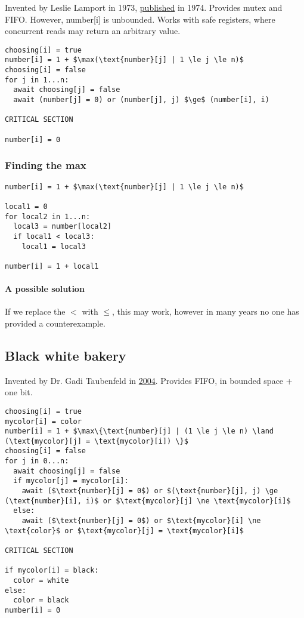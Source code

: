 \documentclass{idc_msc}
\begin{document}
Invented by Leslie Lamport in 1973, \href{http://research.microsoft.com/users/lamport/pubs/bakery.pdf}{published} in 1974.
Provides mutex and FIFO.
However, number[i] is unbounded.
Works with safe registers, where concurrent reads may return an arbitrary value.

\begin{lstlisting}[frame=L,mathescape=true,title={For processes $i=1...n$}]
choosing[i] = true
number[i] = 1 + $\max(\text{number}[j] | 1 \le j \le n)$
choosing[i] = false
for j in 1...n:
  await choosing[j] = false
  await (number[j] = 0) or (number[j], j) $\ge$ (number[i], i)

CRITICAL SECTION

number[i] = 0
\end{lstlisting}

\subsubsection{Finding the max}

\begin{lstlisting}[frame=L,mathescape=true,title={For processes $i=1...n$}]
number[i] = 1 + $\max(\text{number}[j] | 1 \le j \le n)$

local1 = 0
for local2 in 1...n:
  local3 = number[local2]
  if local1 < local3:
    local1 = local3

number[i] = 1 + local1
\end{lstlisting}

\paragraph{A possible solution}
If we replace the $<$ with $\le$, this may work, however in many years no one has provided a counterexample.

\subsection{Black white bakery}

Invented by Dr. Gadi Taubenfeld in \href{https://www.cs.tau.ac.il/~afek/gadi.pdf}{2004}.
Provides FIFO, in bounded space + one bit.

\begin{lstlisting}[frame=L,mathescape=true,title={For processes $i=1...n$}]
choosing[i] = true
mycolor[i] = color
number[i] = 1 + $\max\{\text{number}[j] | (1 \le j \le n) \land (\text{mycolor}[j] = \text{mycolor}[i]) \}$
choosing[i] = false
for j in 0...n:
  await choosing[j] = false
  if mycolor[j] = mycolor[i]:
    await ($\text{number}[j] = 0$) or $(\text{number}[j], j) \ge (\text{number}[i], i)$ or $\text{mycolor}[j] \ne \text{mycolor}[i]$
  else:
    await ($\text{number}[j] = 0$) or $\text{mycolor}[i] \ne \text{color}$ or $\text{mycolor}[j] = \text{mycolor}[i]$

CRITICAL SECTION

if mycolor[i] = black:
  color = white
else:
  color = black
number[i] = 0
\end{lstlisting}
\end{document}
